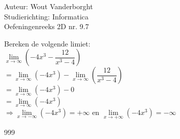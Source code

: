 \documentclass[a4paper]{article}
\newcommand{\Limit}{\lim\limits_}
\begin{document}
  
\noindent \large Auteur: Wout Vanderborght\\
\noindent \large Studierichting: Informatica\\
\noindent \large Oefeningenreeks 2D nr. 9.7\\

\medskip

\normalsize

Bereken de volgende limiet: \\

$ \Limit{x \rightarrow \infty} \left(-4x^3 - \dfrac{12}{x^3 - 4}\right) $ \\

$ = \Limit{x \rightarrow \infty} \left(-4x^3\right) - \Limit{x \rightarrow \infty} \left(\dfrac{12}{x^3 - 4}\right) $ \\

$ = \Limit{x \rightarrow \infty} \left(-4x^3\right) - 0 $ \\

$ = \Limit{x \rightarrow \infty} \left(-4x^3\right) $ \\

$ \Rightarrow \Limit{x \rightarrow -\infty} \left(-4x^3\right) = +\infty $ en $ \Limit{x \rightarrow +\infty} \left(-4x^3\right) = -\infty $ \\

\begin{thebibliography}{999}
\end{thebibliography}
\end{document}
